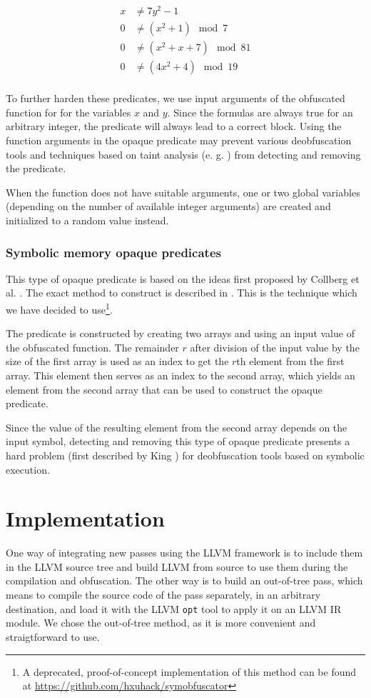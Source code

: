 \documentclass[
  digital, %
  notable,   %
  twoside, %
  nolof,     %
  nolot,     %
]{fithesis3}
\theoremstyle{definition}
\begin{document}
$$
\begin{aligned}
x &\neq 7y^2 - 1  \\
0 &\neq (x^2 + 1) \mod7 \\
0 &\neq (x^2 + x + 7) \mod 81  \\
0 &\neq (4x^2 + 4) \mod 19 \\
\end{aligned}
$$

To further harden these predicates, we use input arguments of the obfuscated function for for the variables $x$ and $y$. Since the formulas are always true for an arbitrary integer, the predicate will always lead to a correct block. Using the function arguments in the opaque predicate may prevent various deobfuscation tools and techniques based on taint analysis (e. g. \cite{generic_deobfuscation}) from detecting and removing the predicate. 

When the function does not have suitable arguments, one or two global variables (depending on the number of available integer arguments) are created and initialized to a random value instead. 

\subsection{Symbolic memory opaque predicates} \label{sec:sym_mem}
This type of opaque predicate is based on the ideas first proposed by Collberg et al. \cite{manufacturing_opaque}. The exact method to construct is described in \cite{bi_opaque}. This is the technique which we have decided to use\footnote{A deprecated, proof-of-concept implementation of this method can be found at \url{https://github.com/hxuhack/symobfuscator}}. 

The predicate is constructed by creating two arrays and using an input value of the obfuscated function. The remainder $r$ after division of the input value by the size of the first array is used as an index to get the $r$th element from the first array. This element then serves as an index to the second array, which yields an element from the second array that can be used to construct the opaque predicate. 

Since the value of the resulting element from the second array depends on the input symbol, detecting and removing this type of opaque predicate presents a hard problem (first described by King \cite{King1976}) for deobfuscation tools based on symbolic execution. 

\chapter{Implementation} \label{chap:impl}
One way of integrating new passes using the LLVM framework is to include them in the LLVM source tree and build LLVM from source to use them during the compilation and obfuscation. The other way is to build an out-of-tree pass, which means to compile the source code of the pass separately, in an arbitrary destination, and load it with the LLVM \texttt{opt} tool to apply it on an LLVM IR module. We chose the out-of-tree method, as it is more convenient and straigtforward to use. 
\end{document}
